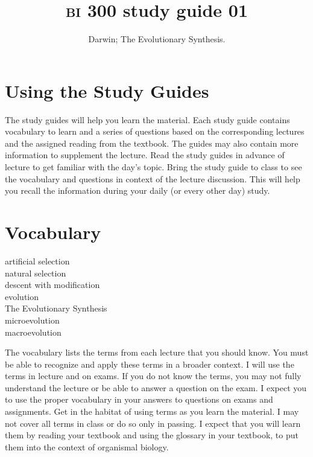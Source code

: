 \documentclass[letterpaper]{tufte-handout}
\title{{\scshape bi} 300 study guide 01\hfill}
\author{Darwin; The Evolutionary Synthesis.}
\date{} %
\begin{document}
\maketitle	%


\section{Using the Study Guides}
The study guides will help you learn the material.  Each study guide contains vocabulary to learn and a series of questions based on the corresponding lectures and the assigned reading from the textbook.  The guides may also contain more information to supplement the lecture.  Read the study guides in advance of lecture to get familiar with the day's topic. Bring the study guide to class to see the vocabulary and questions in context of the lecture discussion.  This will help you recall the information during your daily (or every other day) study.

\section{Vocabulary}
\vspace{-1\baselineskip}
\begin{multicols}{2}
artificial selection\\
natural selection\\
descent with modification\\
evolution\\
The Evolutionary Synthesis\\
microevolution\\
macroevolution
\end{multicols}

\noindent The vocabulary lists the terms from each lecture that you should know. You must be able to recognize and apply these terms in a broader context.  I will use the terms in lecture and on exams. If you do not know the terms, you may not fully understand the lecture or be able to answer a question on the exam. I expect you to use the proper vocabulary in your answers to questions on exams and assignments.  Get in the habitat of using terms as you learn the material.  I may not cover all terms in class or do so only in passing.  I expect that you will learn them by reading your textbook and using the glossary in your textbook, to put them into the context of organismal biology.
\end{document}
